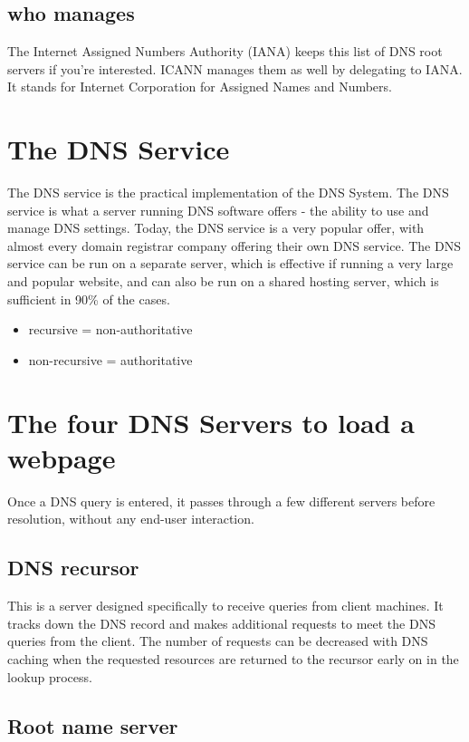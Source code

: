 \documentclass[a4paper,12pt]{article}
\begin{document}
\subsection{who manages}
The Internet Assigned Numbers Authority (IANA) keeps this list of DNS root servers if you're interested. ICANN manages them as well by delegating to IANA. It stands for Internet Corporation for Assigned Names and Numbers.

\section{The DNS Service}
The DNS service is the practical implementation of the DNS System. The DNS service is what a server running DNS software offers - the ability to use and manage DNS settings. Today, the DNS service is a very popular offer, with almost every domain registrar company offering their own DNS service. The DNS service can be run on a separate server, which is effective if running a very large and popular website, and can also be run on a shared hosting server, which is sufficient in 90\% of the cases.

\begin{itemize}
\item{recursive = non-authoritative}
\item{non-recursive = authoritative}
\end{itemize}

\section{The four DNS Servers to load a webpage}
Once a DNS query is entered, it passes through a few different servers before resolution, without any end-user interaction.

\subsection{DNS recursor}

This is a server designed specifically to receive queries from client machines. It tracks down the DNS record and makes additional requests to meet the DNS queries from the client. The number of requests can be decreased with DNS caching when the requested resources are returned to the recursor early on in the lookup process.

\subsection{Root name server}
\end{document}
